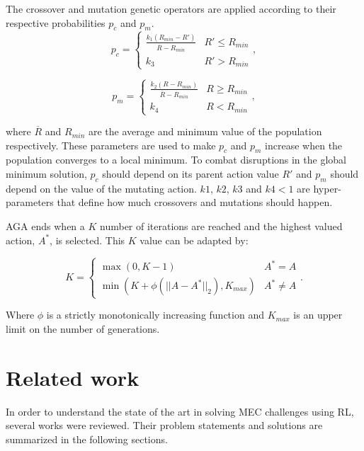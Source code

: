 The crossover and mutation genetic operators are applied according to their respective probabilities $p_c$ and $p_m$.
\begin{equation}
  p_c =
    \begin{cases}
      \frac{k_1(R_{min}-R')}{\overline{R} - R_{min}} & R' \leq R_{min}\\
      k_3 & R' > R_{min}
    \end{cases},
\end{equation}

\begin{equation}
  p_m =
    \begin{cases}
      \frac{k_2(R-R_{min})}{\overline{R} - R_{min}} & R \geq R_{min}\\
      k_4 & R < R_{min}
    \end{cases},       
\end{equation}

where $\overline{R}$ and $R_{min}$ are the average and minimum value of the population respectively. These parameters are used to make $p_c$ and $p_m$ increase when the population converges to a local minimum. To combat disruptions in the global minimum solution, $p_c$ should depend on its parent action value $R'$ and $p_m$ should depend on the value of the mutating action. $k1$, $k2$, $k3$ and $k4 < 1$ are hyper-parameters that define how much crossovers and mutations should happen.

\acrshort{AGA} ends when a $K$ number of iterations are reached and the highest valued action, $A^*$, is selected. This $K$ value can be adapted by:

\begin{equation}
  K =
    \begin{cases}
      \max(0, K-1) & A^* = A\\
      \min(K + \phi(||A-A^*||_2 ), K_{max}) & A^* \neq A
    \end{cases}.
\end{equation}

Where $\phi$ is a strictly monotonically increasing function and $K_{max}$ is an upper limit on the number of generations. 

\section{Related work} \label{section:RW}

\noindent In order to understand the state of the art in solving \acrshort{MEC} challenges using \acrshort{RL}, several works were reviewed. Their problem statements and solutions are summarized in the following sections.

